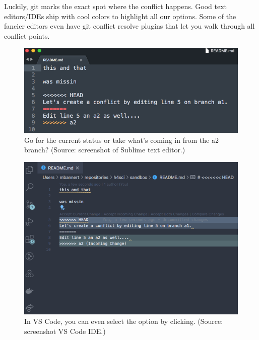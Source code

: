 \documentclass[
  12pt,
  letterpaper,
]{krantz}
\begin{document}
Luckily, git marks the exact spot where the
conflict happens. Good text editors/IDEs ship with
cool colors to highlight all our options. Some of the fancier editors
even have git conflict resolve plugins that let you walk through all
conflict points.

\begin{figure}

{\centering \includegraphics{./images/sublime_conflict.png}

}

\caption{Go for the current status or take what's coming in from the a2
branch? (Source: screenshot of Sublime text editor.)}

\end{figure}

\begin{figure}

{\centering \includegraphics{./images/vscode_conflict.png}

}

\caption{In VS Code, you can even select the option by clicking.
(Source: screenshot VS Code IDE.)}

\end{figure}
\end{document}
